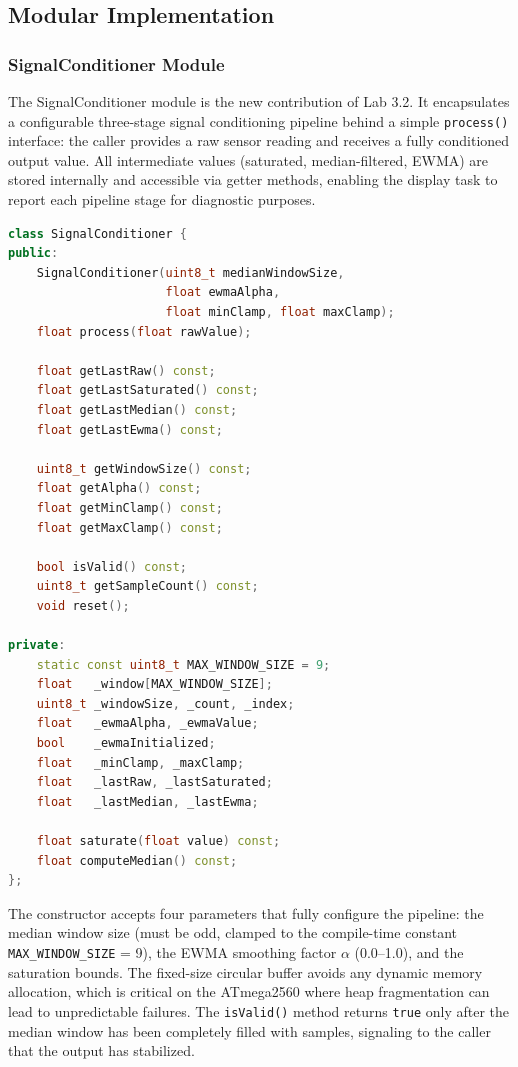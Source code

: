 \subsection{Modular Implementation}

\subsubsection{SignalConditioner Module}

The SignalConditioner module is the new contribution of Lab 3.2. It encapsulates a configurable three-stage signal conditioning pipeline behind a simple \texttt{process()} interface: the caller provides a raw sensor reading and receives a fully conditioned output value. All intermediate values (saturated, median-filtered, EWMA) are stored internally and accessible via getter methods, enabling the display task to report each pipeline stage for diagnostic purposes.

\begin{lstlisting}[language=C++, caption=SignalConditioner interface (SignalConditioner.h), label=lst:signal_conditioner_h]
class SignalConditioner {
public:
    SignalConditioner(uint8_t medianWindowSize,
                      float ewmaAlpha,
                      float minClamp, float maxClamp);
    float process(float rawValue);

    float getLastRaw() const;
    float getLastSaturated() const;
    float getLastMedian() const;
    float getLastEwma() const;

    uint8_t getWindowSize() const;
    float getAlpha() const;
    float getMinClamp() const;
    float getMaxClamp() const;

    bool isValid() const;
    uint8_t getSampleCount() const;
    void reset();

private:
    static const uint8_t MAX_WINDOW_SIZE = 9;
    float   _window[MAX_WINDOW_SIZE];
    uint8_t _windowSize, _count, _index;
    float   _ewmaAlpha, _ewmaValue;
    bool    _ewmaInitialized;
    float   _minClamp, _maxClamp;
    float   _lastRaw, _lastSaturated;
    float   _lastMedian, _lastEwma;

    float saturate(float value) const;
    float computeMedian() const;
};
\end{lstlisting}

The constructor accepts four parameters that fully configure the pipeline: the median window size (must be odd, clamped to the compile-time constant \texttt{MAX\_WINDOW\_SIZE} = 9), the EWMA smoothing factor $\alpha$ (0.0--1.0), and the saturation bounds. The fixed-size circular buffer avoids any dynamic memory allocation, which is critical on the ATmega2560 where heap fragmentation can lead to unpredictable failures. The \texttt{isValid()} method returns \texttt{true} only after the median window has been completely filled with samples, signaling to the caller that the output has stabilized.

